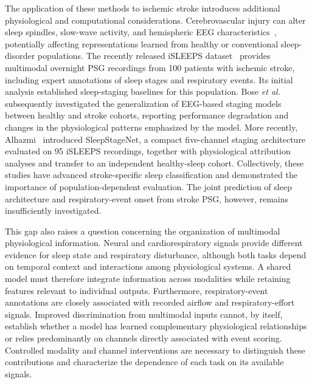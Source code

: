 \documentclass[a4paper,fleqn]{cas-sc}
\begin{document}
The application of these methods to ischemic stroke introduces additional physiological and computational considerations. Cerebrovascular injury can alter sleep spindles, slow-wave activity, and hemispheric EEG characteristics~\cite{gottselig2002stroke,fernandez2019spindles,facchin2020slowwaves,simpson2023laterality,zheng2025spindles,anastasi2017bsi}, potentially affecting representations learned from healthy or conventional sleep-disorder populations. The recently released iSLEEPS dataset~\cite{maiti2026isleeps} provides multimodal overnight PSG recordings from 100 patients with ischemic stroke, including expert annotations of sleep stages and respiratory events. Its initial analysis established sleep-staging baselines for this population. Bose \emph{et al.}~\cite{bose2026gap} subsequently investigated the generalization of EEG-based staging models between healthy and stroke cohorts, reporting performance degradation and changes in the physiological patterns emphasized by the model. More recently, Alhazmi~\cite{alhazmi2026sleepstagenet} introduced SleepStageNet, a compact five-channel staging architecture evaluated on 95 iSLEEPS recordings, together with physiological attribution analyses and transfer to an independent healthy-sleep cohort. Collectively, these studies have advanced stroke-specific sleep classification and demonstrated the importance of population-dependent evaluation. The joint prediction of sleep architecture and respiratory-event onset from stroke PSG, however, remains insufficiently investigated.

This gap also raises a question concerning the organization of multimodal physiological information. Neural and cardiorespiratory signals provide different evidence for sleep state and respiratory disturbance, although both tasks depend on temporal context and interactions among physiological systems. A shared model must therefore integrate information across modalities while retaining features relevant to individual outputs. Furthermore, respiratory-event annotations are closely associated with recorded airflow and respiratory-effort signals. Improved discrimination from multimodal inputs cannot, by itself, establish whether a model has learned complementary physiological relationships or relies predominantly on channels directly associated with event scoring. Controlled modality and channel interventions are necessary to distinguish these contributions and characterize the dependence of each task on its available signals.
\end{document}
